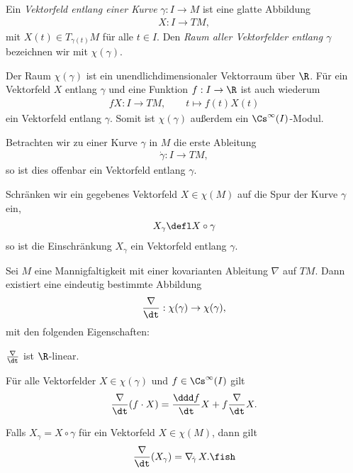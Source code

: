 \documentclass[%
	paper=a5,%
	fleqn,%
	DIV=18,%
	BCOR=0mm,
	fontsize=11pt,
	titlepage=false,%
	bibliography=totoc,
	DIV=18,%
	twoside=true,
	pdftitle=Riemannsche Geometrie,
	pdfauthor=Uwe Semmelmann,
	numbers=noendperiod]%
	{scrbook}
\begin{document}
\begin{defn}
Ein \emph{Vektorfeld entlang einer Kurve}  $\gamma: I\to M$ ist eine glatte
Abbildung
\begin{align*}
X: I\to TM,
\end{align*}
mit $X(t)\in T_{\gamma(t)}M$ für alle $t\in I$. Den \emph{Raum aller
Vektorfelder entlang $\gamma$} bezeichnen wir mit $\chi(\gamma)$.\fish
\end{defn}

\begin{rem}
Der Raum $\chi(\gamma)$ ist ein unendlichdimensionaler Vektorraum über $\R$. Für
ein Vektorfeld $X$ entlang $\gamma$ und eine Funktion $f: I\to \R$ ist auch
wiederum
\begin{align*}
fX : I\to TM,\qquad t\mapsto f(t)X(t)
\end{align*}
ein Vektorfeld entlang $\gamma$. Somit ist $\chi(\gamma)$ außerdem ein
$\Cs^\infty(I)$-Modul.\map
\end{rem}

\begin{ex}
\begin{exenum}
\item Betrachten wir zu einer Kurve $\gamma$ in $M$ die erste Ableitung
\begin{align*}
\dot{\gamma}: I\to TM,
\end{align*} 
so ist dies offenbar ein Vektorfeld entlang $\gamma$.
\item Schränken wir ein gegebenes Vektorfeld $X\in\chi(M)$ auf die Spur der
Kurve $\gamma$ ein,
\begin{align*}
X_\gamma \defl X\circ \gamma 
\end{align*}
so ist die Einschränkung $X_\gamma$ ein Vektorfeld entlang $\gamma$.\boxc
\end{exenum}
\end{ex}

\begin{prop}
Sei $M$ eine Mannigfaltigkeit mit einer kovarianten Ableitung $\nabla$ auf $TM$.
Dann existiert eine eindeutig bestimmte Abbildung
\begin{align*}
\frac{\nabla}{\dt} : \chi(\gamma)\to \chi(\gamma),
\end{align*}
mit den folgenden Eigenschaften:
\begin{propenum}
\item $\frac{\nabla}{\dt}$ ist $\R$-linear.
\item Für alle Vektorfelder $X\in\chi(\gamma)$ und $f\in\Cs^\infty(I)$ gilt
\begin{align*}
\frac{\nabla}{\dt}(f\cdot X) = \frac{\ddd f}{\dt}X + f \frac{\nabla}{\dt}X.
\end{align*}
\item Falls $X_\gamma = X\circ \gamma$ für ein Vektorfeld $X\in\chi(M)$, dann
gilt
\begin{align*}
\frac{\nabla}{\dt}(X_\gamma) = \nabla_{\!\dot{\gamma}}\,X.\fish
\end{align*}
\end{propenum}
\end{prop}
\end{document}

